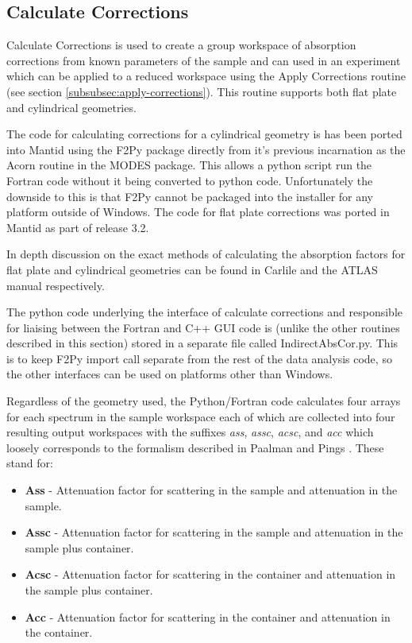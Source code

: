 \documentclass[paper=a4, fontsize=11pt]{scrartcl}	%
\numberwithin{equation}{section}															%
\numberwithin{figure}{section}																%
\numberwithin{table}{section}																%
\begin{document}
\subsection{Calculate Corrections}
Calculate Corrections is used to create a group workspace of absorption corrections from known parameters of the sample and can used in an experiment which can be applied to a reduced workspace using the Apply Corrections routine (see section \ref{subsubsec:apply-corrections}). This routine supports both flat plate and cylindrical geometries.

The code for calculating corrections for a cylindrical geometry is has been ported into Mantid using the F2Py package directly from it's previous incarnation as the Acorn routine in the MODES package. This allows a python script run the Fortran code without it being converted to python code. Unfortunately the downside to this is that F2Py cannot be packaged into the installer for any platform outside of Windows. The code for flat plate corrections was ported in Mantid as part of release 3.2.

In depth discussion on the exact methods of calculating the absorption factors for flat plate and cylindrical geometries can be found in Carlile \cite{ccarlile1974} and the ATLAS manual \cite{aksoper1989} respectively.

The python code underlying the interface of calculate corrections and responsible for liaising between the Fortran and C++ GUI code is (unlike the other routines described in this section) stored in a separate file called IndirectAbsCor.py. This is to keep F2Py import call separate from the rest of the data analysis code, so the other interfaces can be used on platforms other than Windows.

Regardless of the geometry used, the Python/Fortran code calculates four arrays for each spectrum in the sample workspace each of which are collected into four resulting output workspaces with the suffixes \textit{ass}, \textit{assc}, \textit{acsc}, and \textit{acc} which loosely corresponds to the formalism described in Paalman and Pings \cite{hhpaalman1962}. These stand for:

\begin{itemize}
\item \textbf{Ass} - Attenuation factor for scattering in the sample and attenuation in the sample.
\item \textbf{Assc} - Attenuation factor for scattering in the sample and attenuation in the sample plus container.
\item \textbf{Acsc} - Attenuation factor for scattering in the container and attenuation in the sample plus container.
\item \textbf{Acc} - Attenuation factor for scattering in the container and attenuation in the container.
\end{itemize}
\end{document}
